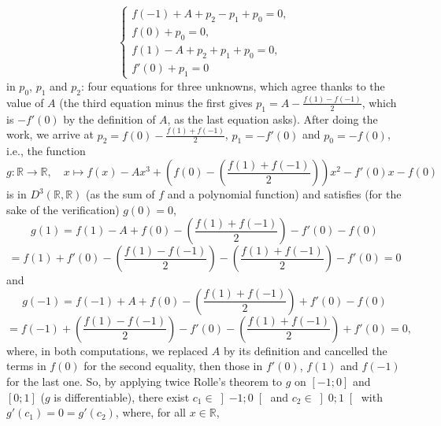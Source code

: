 \begin{solution}
    \[
        \begin{cases}
            f\left(-1\right)+A+p_2-p_1+p_0 = 0, \\
            f\left(0\right)+p_0 = 0, \\
            f\left(1\right)-A+p_2+p_1+p_0 = 0, \\
            f'\left(0\right)+p_1 = 0
        \end{cases}
    \]
    in \( p_0 \), \( p_1 \) and \( p_2 \): four equations for three unknowns, which agree thanks to the value of \( A \) (the third equation minus the first gives \( p_1 = A-\frac{f\left(1\right)-f\left(-1\right)}{2} \), which is \( -f'\left(0\right) \) by the definition of \( A \), as the last equation asks). After doing the work, we arrive at \( p_2 = f\left(0\right)-\frac{f\left(1\right)+f\left(-1\right)}{2} \), \( p_1 = -f'\left(0\right) \) and \( p_0 = -f\left(0\right) \), i.e., the function
    \[
        g \colon \mathbb{R} \longrightarrow \mathbb{R}, \quad x \longmapsto f\left(x\right)-Ax^3+\left(f\left(0\right)-\left(\frac{f\left(1\right)+f\left(-1\right)}{2}\right)\right)x^2-f'\left(0\right)x-f\left(0\right)
    \]
    is in \( D^3\left(\mathbb{R},\mathbb{R}\right) \) (as the sum of \( f \) and a polynomial function) and satisfies (for the sake of the verification) \( g\left(0\right) = 0 \),
    \[
        g\left(1\right) = f\left(1\right)-A+f\left(0\right)-\left(\frac{f\left(1\right)+f\left(-1\right)}{2}\right)-f'\left(0\right)-f\left(0\right)
    \]
    \[
        = f\left(1\right)+f'\left(0\right)-\left(\frac{f\left(1\right)-f\left(-1\right)}{2}\right)-\left(\frac{f\left(1\right)+f\left(-1\right)}{2}\right)-f'\left(0\right) = 0
    \]
    and
    \[
        g\left(-1\right) = f\left(-1\right)+A+f\left(0\right)-\left(\frac{f\left(1\right)+f\left(-1\right)}{2}\right)+f'\left(0\right)-f\left(0\right)
    \]
    \[
        = f\left(-1\right)+\left(\frac{f\left(1\right)-f\left(-1\right)}{2}\right)-f'\left(0\right)-\left(\frac{f\left(1\right)+f\left(-1\right)}{2}\right)+f'\left(0\right) = 0,
    \]
    where, in both computations, we replaced \( A \) by its definition and cancelled the terms in \( f\left(0\right) \) for the second equality, then those in \( f'\left(0\right) \), \( f\left(1\right) \) and \( f\left(-1\right) \) for the last one. So, by applying twice Rolle's theorem to \( g \) on \( \left[-1;0\right] \) and \( \left[0;1\right] \) (\( g \) is differentiable), there exist \( c_1 \in \left]-1;0\right[ \) and \( c_2 \in \left]0;1\right[ \) with \( g'\left(c_1\right) = 0 = g'\left(c_2\right) \), where, for all \( x \in \mathbb{R} \),

\end{solution}
